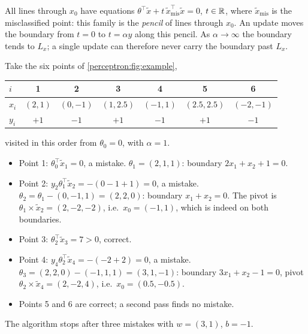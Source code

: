 \begin{notechapter}
\begin{keyidea}
All lines through $x_0$ have equations $\theta^\top\tilde x + t\,\tilde x_{\mathrm{mis}}^\top\tilde x = 0$, $t\in\mathbb{R}$, where $\tilde x_{\mathrm{mis}}$ is the
misclassified point: this family is the \emph{pencil} of lines through $x_0$. An update moves the
boundary from $t = 0$ to $t = \alpha y$ along this pencil. As $\alpha\to\infty$ the boundary tends to $L_x$; a
single update can therefore never carry the boundary past $L_x$.
\end{keyidea}

\begin{example}\label{perceptron:ex:three}
Take the six points of \cref{perceptron:fig:example},
\begin{center}
\begin{tabular}{@{}lcccccc@{}}
\toprule
$i$ & 1 & 2 & 3 & 4 & 5 & 6 \\
\midrule
$x_i$ & $(2, 1)$ & $(0, -1)$ & $(1, 2.5)$ & $(-1, 1)$ & $(2.5, 2.5)$ & $(-2, -1)$ \\
$y_i$ & $+1$ & $-1$ & $+1$ & $-1$ & $+1$ & $-1$ \\
\bottomrule
\end{tabular}
\end{center}
visited in this order from $\theta_0 = 0$, with $\alpha = 1$.
\begin{itemize}[nosep]
  \item Point 1: $\theta_0^\top\tilde x_1 = 0$, a mistake. $\theta_1 = (2, 1, 1)$: boundary $2x_1 + x_2 + 1 = 0$.
  \item Point 2: $y_2\theta_1^\top\tilde x_2 = -(0 - 1 + 1) = 0$, a mistake. $\theta_2 = \theta_1 - (0, -1, 1) = (2, 2, 0)$: boundary
        $x_1 + x_2 = 0$. The pivot is $\theta_1\times\tilde x_2 = (2, -2, -2)$, i.e.\ $x_0 = (-1, 1)$, which is indeed on both
        boundaries.
  \item Point 3: $\theta_2^\top\tilde x_3 = 7>0$, correct.
  \item Point 4: $y_4\theta_2^\top\tilde x_4 = -(-2 + 2) = 0$, a mistake. $\theta_3 = (2, 2, 0) - (-1, 1, 1) = (3, 1, -1)$: boundary
        $3x_1 + x_2 - 1 = 0$, pivot $\theta_2\times\tilde x_4 = (2, -2, 4)$, i.e.\ $x_0 = (0.5, -0.5)$.
  \item Points 5 and 6 are correct; a second pass finds no mistake.
\end{itemize}
The algorithm stops after three mistakes with $w = (3, 1)$, $b = -1$.
\end{example}


\end{notechapter}
